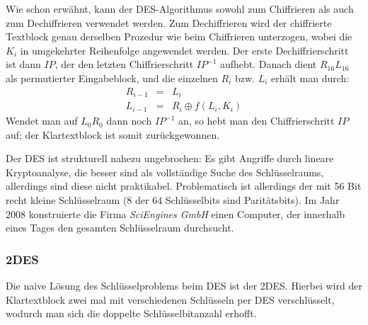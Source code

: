 
Wie schon erwähnt, kann der DES-Algorithmus sowohl zum Chiffrieren als auch zum Dechiffrieren verwendet werden. Zum Dechiffrieren wird der chiffrierte
Textblock genau derselben Prozedur wie beim Chiffrieren unterzogen, wobei die $K_i$ in umgekehrter Reihenfolge angewendet werden. Der erste Dechiffrierschritt
ist dann $IP$, der den letzten Chiffrierschritt $IP^{-1}$ aufhebt. Danach dient $R_{16}L_{16}$ als permutierter Eingabeblock, und die einzelnen $R_i$ bzw.
$L_i$ erhält man durch:
\begin{eqnarray*}
  R_{i-1}	& = 	& L_i \\
  L_{i-1}	& = 	& R_i\oplus f(L_i,K_i)
\end{eqnarray*}
Wendet man auf $L_0R_0$ dann noch $IP^{-1}$ an, so hebt man den Chiffrierschritt $IP$ auf; der Klartextblock ist somit zurückgewonnen.

Der DES ist strukturell nahezu ungebrochen: Es gibt Angriffe durch lineare Kryptoanalyse, die besser sind als vollständige Suche des Schlüsselraums, allerdings
sind diese nicht praktikabel. Problematisch ist allerdings der mit 56 Bit recht kleine Schlüsselraum (8 der 64 Schlüsselbits sind Paritätsbits). Im Jahr 2008 konstruierte die Firma \emph{SciEngines GmbH} einen Computer, der innerhalb eines Tages den gesamten Schlüsselraum durchsucht. %

\subsubsection{2DES}
Die naive Lösung des Schlüsselproblems beim DES ist der 2DES. Hierbei wird der Klartextblock zwei mal mit verschiedenen Schlüsseln per DES verschlüsselt, wodurch
man sich die doppelte Schlüsselbitanzahl erhofft.


